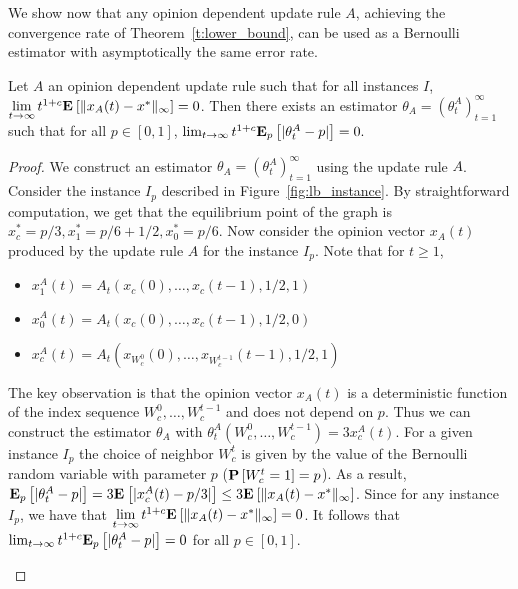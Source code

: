 We show now that any opinion dependent update rule $A$, achieving the
convergence rate of Theorem~\ref{t:lower_bound}, can be used as a Bernoulli
estimator with asymptotically the same error rate.
\begin{lemma}\label{l:reduction}
  Let $A$ an opinion dependent update rule such that for all instances $I$,
  $\lim \limits_{t \rightarrow \infty} t^{1+c}
  \bm{\mathrm{E}}_{} \left[ \| x_A(t)-x^* \|_{\infty} \right]=0$.
  Then there exists an estimator $\theta_A=(\theta_t^A)_{t=1}^\infty$ such that for all
  $p \in [0,1]$,
  \(\lim_{t \rightarrow \infty}t^{1+c}\bm{\mathrm{E}}_{p} \left[ |\theta_t^A-p| \right]=0.\)
\end{lemma}
\begin{proof}
  We construct an estimator $\theta_A = (\theta^A_t)_{t=1}^\infty$
  using the update rule $A$. Consider the instance $I_p$ described in
  Figure~\ref{fig:lb_instance}.
  By straightforward computation, we get that the equilibrium point of
  the graph is $x_c^* = p/3, x_1^* = p/6+1/2, x_0^* = p/6$.
  Now consider the opinion vector $x_A(t)$ produced by the update
  rule $A$ for the instance $I_p$. Note that for $t \geq 1$,
  \begin{itemize}
   \item  $x_1^A(t)=A_t(x_c(0),\ldots,x_c(t-1),1/2,1)$
   \item  $x_0^A(t)=A_t(x_c(0),\ldots,x_c(t-1),1/2,0)$
   \item  $x_c^A(t)=A_t(x_{W_c^0}(0),\ldots,x_{W_c^{t-1}}(t-1),1/2,1)$
  \end{itemize}
  The key observation is that the opinion vector $x_A(t)$ is a deterministic function
  of the index sequence $W_c^0,\ldots,W_c^{t-1}$ and does not depend on $p$. Thus we
  can construct the estimator $\theta_A$ with $\theta_t^A(W_c^0,\ldots,W_c^{t-1}) = 3x_c^A(t)$.
  For a given instance $I_p$ the choice of neighbor $W_c^t$ is given by the value of
  the Bernoulli random variable with parameter $p$ ($\bm{\mathrm{P}}\left[W_c^t=1\right]=p$). As a result,
  $\bm{\mathrm{E}}_{p} \left[ |\theta_t^A-p| \right]= 3\bm{\mathrm{E}}_{} \left[ |x_c^A(t)-p/3| \right]\leq 3\bm{\mathrm{E}}_{} \left[ \| x_A(t)-x^* \|_{\infty} \right]$.
  Since for any instance $I_p$, we have that $\lim \limits_{t \rightarrow \infty} t^{1+c}\bm{\mathrm{E}}_{} \left[ \| x_A(t)-x^* \|_{\infty} \right]=0$.
  It follows that $\lim_{t \rightarrow \infty}t^{1+c}\bm{\mathrm{E}}_{p} \left[ |\theta_t^A -p| \right]=0$ for all $p \in [0,1]$.
  \vspace{-5mm}
  \begin{figure}

\end{figure}
\end{proof}
